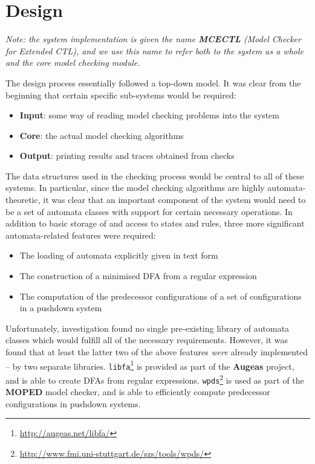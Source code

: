 \documentclass[11pt]{article}
\theoremstyle{definition}
\begin{document}

\section{Design}

\textit{Note: the system implementation is given the name \textbf{MCECTL} (Model Checker for
Extended CTL), and we use this name to refer both to the system as a whole and
the core model checking module.}

The design process essentially followed a top-down model. It was clear from the beginning that certain specific sub-systems would be required:
\begin{itemize}
\item{\textbf{Input}: some way of reading model checking problems into the system}
\item{\textbf{Core}:  the actual model checking algorithms}
\item{\textbf{Output}: printing results and traces obtained from checks}
\end{itemize}

The data structures used in the checking process would be central to all of
these systems.  In particular, since the model checking algorithms are highly
automata-theoretic, it was clear that an important component of the system
would need to be a set of automata classes with support for certain necessary
operations. In addition to basic storage of and access to states and rules,
three more significant automata-related features were required:

\begin{itemize}
\item{The loading of automata explicitly given in text form}
\item{The construction of a minimised DFA from a regular expression}
\item{The computation of the predecessor configurations of a set of
configurations in a pushdown system}
\end{itemize}

Unfortunately, investigation found no single pre-existing library of automata
classes which would fulfill all of the necessary requirements. However, it was
found that at least the latter two of the above features \textit{were} already
implemented -- by two separate libraries.
\texttt{libfa}\footnote{\url{http://augeas.net/libfa/}} is provided as part of
the \textbf{Augeas} project, and is able to create DFAs from regular expressions.
\texttt{wpds}\footnote{\url{http://www.fmi.uni-stuttgart.de/szs/tools/wpds/}}
is used as part of the \textbf{MOPED} model checker, and is able to efficiently
compute predecessor configurations in pushdown systems.
\end{document}
